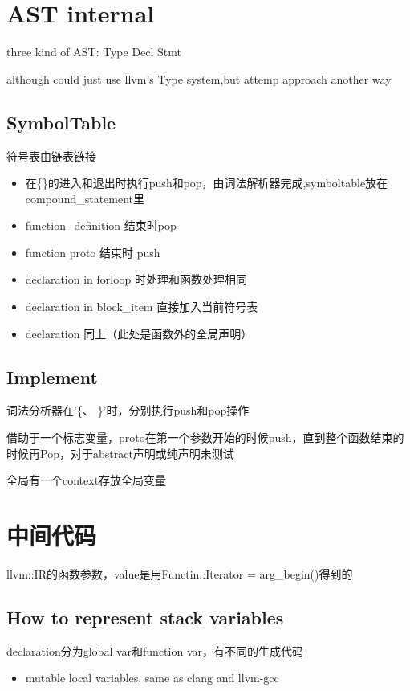 \documentclass[11pt]{article} %
\begin{document}
\section{AST internal}
three kind of AST: Type Decl Stmt

although could just use llvm's Type system,but attemp approach another way
\subsection{SymbolTable}
符号表由链表链接
\begin{itemize}
\item 在\{\}的进入和退出时执行push和pop，由词法解析器完成,symboltable放在compound\_statement里
\item function\_definition 结束时pop
\item function proto 结束时 push
\item declaration in for\-loop 时处理和函数处理相同
\item declaration in block\_item 直接加入当前符号表
\item declaration 同上（此处是函数外的全局声明）
\end{itemize}

\subsection{Implement}
词法分析器在'\{、 \}'时，分别执行push和pop操作

借助于一个标志变量，proto在第一个参数开始的时候push，直到整个函数结束的时候再Pop，对于abstract声明或纯声明未测试

全局有一个context存放全局变量


\section{中间代码}
llvm::IR的函数参数，value是用Functin::Iterator = arg\_begin()得到的
\subsection{How to represent stack variables}
declaration分为global var和function var，有不同的生成代码

\begin{itemize}
\item mutable local variables, same as clang and llvm-gcc
\end{itemize}
\end{document}
